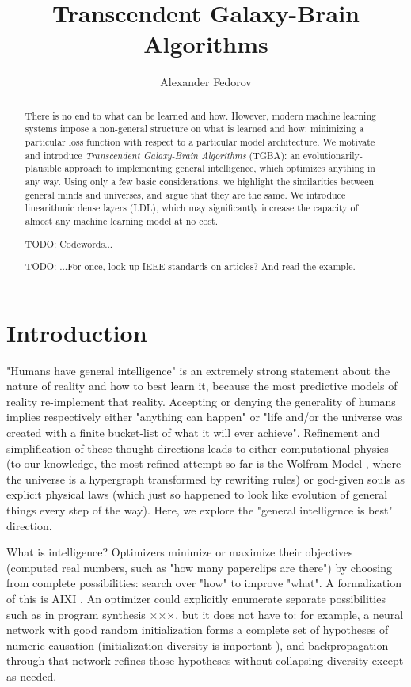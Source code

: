\documentclass{article}
\begin{document}
\title{Transcendent Galaxy-Brain Algorithms}
\author{Alexander Fedorov}

\maketitle

\begin{abstract}

There is no end to what can be learned and how. However, modern machine learning systems impose a non-general structure on what is learned and how: minimizing a particular loss function with respect to a particular model architecture. We motivate and introduce \textit{Transcendent Galaxy-Brain Algorithms} (TGBA): an evolutionarily-plausible approach to implementing general intelligence, which optimizes anything in any way. Using only a few basic considerations, we highlight the similarities between general minds and universes, and argue that they are the same. We introduce linearithmic dense layers (LDL), which may significantly increase the capacity of almost any machine learning model at no cost.

    TODO: Codewords...

    TODO: ...For once, look up IEEE standards on articles? And read the example.

\end{abstract}

\section{Introduction}

"Humans have general intelligence" is an extremely strong statement about the nature of reality and how to best learn it, because the most predictive models of reality re-implement that reality. Accepting or denying the generality of humans implies respectively either "anything can happen" or "life and/or the universe was created with a finite bucket-list of what it will ever achieve". Refinement and simplification of these thought directions leads to either computational physics (to our knowledge, the most refined attempt so far is the Wolfram Model \cite{Wolfram_2020}, where the universe is a hypergraph transformed by rewriting rules) or god-given souls as explicit physical laws (which just so happened to look like evolution of general things every step of the way). Here, we explore the "general intelligence is best" direction.

What is intelligence? Optimizers minimize or maximize their objectives (computed real numbers, such as "how many paperclips are there") by choosing from complete possibilities: search over "how" to improve "what". A formalization of this is AIXI \cite{DBLP:journals/corr/cs-AI-0004001}. An optimizer could explicitly enumerate separate possibilities such as in program synthesis ×××, but it does not have to: for example, a neural network with good random initialization forms a complete set of hypotheses of numeric causation (initialization diversity is important \cite{mellor2021neural}), and backpropagation through that network refines those hypotheses without collapsing diversity except as needed.
\end{document}
